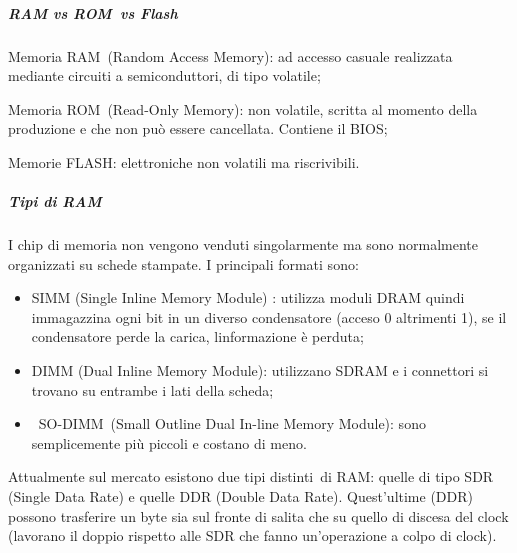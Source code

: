 \documentclass[
]{article}
\providecommand{\tightlist}{%
  \setlength{\itemsep}{0pt}\setlength{\parskip}{0pt}}
\begin{document}
{}

\subparagraph{\texorpdfstring{{RAM }{vs ROM}{~}{vs
Flash}}{RAM vs ROM~vs Flash}}\label{h.a2bwla9j1lhw}

{Memoria RAM}{~(Random Access Memory): ad accesso casuale realizzata
mediante circuiti a semiconduttori, di tipo volatile;}

{}

{Memoria ROM}{~(Read-Only Memory): non volatile, scritta al momento
della produzione e che non può essere cancellata. Contiene il BIOS;}

{}

{Memorie FLASH}{: elettroniche non volatili ma riscrivibili.}

{}

\subparagraph{\texorpdfstring{{Tipi di RAM
}}{Tipi di RAM }}\label{h.qi3warjf24pc}

{I chip di memoria non vengono venduti singolarmente ma sono normalmente
organizzati su schede stampate. I principali formati sono:}

{}

\begin{itemize}
\tightlist
\item
  {SIMM }{(Single Inline Memory Module) : utilizza moduli DRAM quindi
  immagazzina ogni bit in un diverso condensatore (acceso 0 altrimenti
  1), se il condensatore perde la carica, l\textquotesingle informazione
  è perduta;}
\end{itemize}

{}

\begin{itemize}
\tightlist
\item
  {DIMM }{(Dual Inline Memory Module): utilizzano SDRAM e i connettori
  si trovano su entrambe i lati della scheda;}
\end{itemize}

{}

\begin{itemize}
\tightlist
\item
  {~}{SO-DIMM}{~(Small Outline Dual In-line Memory Module): sono
  semplicemente più piccoli e costano di meno.}
\end{itemize}

{}

{Attualmente sul mercato esistono }{due tipi distinti}{~di RAM: quelle
di tipo }{SDR }{(Single Data Rate) e quelle }{DDR }{(Double Data Rate).
Quest'ultime (DDR) possono trasferire un byte sia sul fronte di salita
che su quello di discesa del clock (lavorano il doppio rispetto alle SDR
che fanno un'operazione a colpo di clock).}
\end{document}
